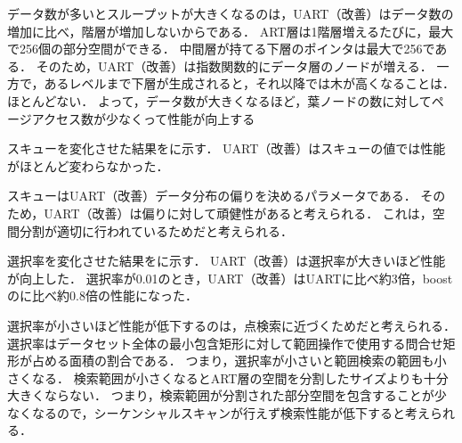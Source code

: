 データ数が多いとスループットが大きくなるのは，UART（改善）はデータ数の増加に比べ，階層が増加しないからである．
ART層は1階層増えるたびに，最大で256個の部分空間ができる．
中間層が持てる下層のポインタは最大で256である．
そのため，UART（改善）は指数関数的にデータ層のノードが増える．
一方で，あるレベルまで下層が生成されると，それ以降では木が高くなることは．ほとんどない．
よって，データ数が大きくなるほど，葉ノードの数に対してページアクセス数が少なくって性能が向上する

スキューを変化させた結果を\Fig{\ref{graph:skew-sc}}に示す．
UART（改善）はスキューの値では性能がほとんど変わらなかった．

スキューはUART（改善）データ分布の偏りを決めるパラメータである．
そのため，UART（改善）は偏りに対して頑健性があると考えられる．
これは，空間分割が適切に行われているためだと考えられる．

選択率を変化させた結果を\Fig{\ref{graph:selectivity-sc}}に示す．
UART（改善）は選択率が大きいほど性能が向上した．
選択率が0.01のとき，UART（改善）はUARTに比べ約3倍，boostの\RTree に比べ約0.8倍の性能になった．

選択率が小さいほど性能が低下するのは，点検索に近づくためだと考えられる．
選択率はデータセット全体の最小包含矩形に対して範囲操作で使用する問合せ矩形が占める面積の割合である．
つまり，選択率が小さいと範囲検索の範囲も小さくなる．
検索範囲が小さくなるとART層の空間を分割したサイズよりも十分大きくならない．
つまり，検索範囲が分割された部分空間を包含することが少なくなるので，シーケンシャルスキャンが行えず検索性能が低下すると考えられる．



